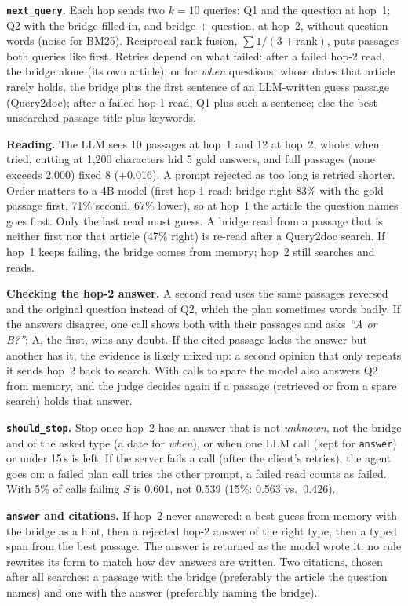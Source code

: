 \documentclass[10pt,a4paper]{article}
\begin{document}
\textbf{\texttt{next\_query}.} Each hop sends two $k{=}10$ queries: Q1 and the question at hop~1; Q2 with the
bridge filled in, and bridge + question, at hop~2, without question words (noise for BM25). Reciprocal rank
fusion, $\sum 1/(3+\mathrm{rank})$, puts passages both queries like first. Retries depend on what failed: after a
failed hop-2 read, the bridge alone (its own article), or for \emph{when} questions, whose dates that article
rarely holds, the bridge plus the first sentence of an LLM-written guess passage (Query2doc); after a failed hop-1
read, Q1 plus such a sentence; else the best unsearched passage title plus keywords.

\textbf{Reading.} The LLM sees 10 passages at hop~1 and 12 at hop~2, whole: when tried, cutting at 1,200 characters hid 5
gold answers, and full passages (none exceeds 2,000) fixed 8 (+0.016). A prompt rejected as too long is retried shorter. Order matters to a 4B model (first hop-1 read: bridge right 83\% with the gold passage first, 71\%
second, 67\% lower), so at hop~1 the article the question names goes first. Only the last read must guess. A bridge read from a passage that is neither first nor that article (47\% right) is re-read after a
Query2doc search. If hop~1 keeps failing, the bridge comes from memory; hop~2 still searches and reads.

\textbf{Checking the hop-2 answer.} A second read uses the same passages reversed and the original question
instead of Q2, which the plan sometimes words badly. If the answers disagree, one call shows both with their passages and asks \emph{``A or B?''}; A, the first, wins any doubt. If the cited
passage lacks the answer but another has it, the evidence is likely mixed up: a second opinion that only repeats
it sends hop~2 back to search. With calls to spare the model also answers Q2 from memory, and the judge decides
again if a passage (retrieved or from a spare search) holds that answer.

\textbf{\texttt{should\_stop}.} Stop once hop~2 has an answer that is not \emph{unknown}, not the bridge and of
the asked type (a date for \emph{when}), or when one LLM call (kept for \texttt{answer}) or under 15\,s is left.
If the server fails a call (after the client's retries), the agent goes on: a failed plan call tries the other
prompt, a failed read counts as failed. With 5\% of calls failing $S$ is 0.601, not 0.539 (15\%: 0.563 vs.\ 0.426).

\textbf{\texttt{answer} and citations.} If hop~2 never answered: a best guess from memory with the bridge as a
hint, then a rejected hop-2 answer of the right type, then a typed span from the best passage. The answer is returned as the model wrote it: no rule rewrites its form
to match how dev answers are written. Two citations, chosen after all searches: a passage with the
bridge (preferably the article the question names) and one with the answer (preferably naming the bridge).
\end{document}
